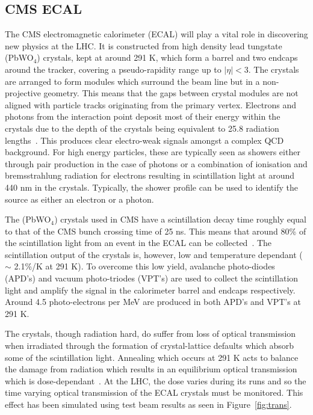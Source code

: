 \documentclass[a4paper,10pt]{article}
\begin{document}
\subsection{CMS ECAL}

The CMS electromagnetic calorimeter (ECAL) will play a vital role in discovering new physics at the LHC. It is constructed from high density lead tungstate (PbWO$_{4}$) crystals, kept at around 291 K, which
form a 
barrel and two endcaps around the tracker, covering a pseudo-rapidity range up to $|\eta | < 3$. The crystals are arranged to form modules which surround the beam line but in a non-projective geometry.
This means that the gaps between crystal modules are not aligned with particle tracks originating from the primary vertex.
Electrons and photons from the interaction point deposit most of their energy within the crystals due to the depth of the crystals being equivalent to 25.8 radiation lengths~\cite{TDR1}. This produces
clear electro-weak signals amongst a complex QCD background. For high energy particles, these are typically 
seen as showers either through pair production in the case of photons or a combination of ionisation and bremsstrahlung radiation for electrons resulting in scintillation light at around 440 nm in the
crystals. Typically, the shower profile can be used to identify the source as either an electron or a photon.

The (PbWO$_{4}$) crystals used in CMS have a scintillation decay time roughly equal to that of the CMS bunch crossing time of 25 ns. This means that around 80\% of the scintillation light from an event
in the ECAL can be collected~\cite{cmsdetector}. The scintillation output of the crystals is, however, low and temperature dependant ($\sim$ 2.1\%/K at 291 K). To overcome this low yield, 
avalanche photo-diodes (APD's) and vacuum photo-triodes (VPT's) are used to collect the scintillation light and amplify the signal in the calorimeter barrel and endcaps respectively. Around 4.5 photo-electrons
per MeV are produced in both APD's and VPT's at 291 K.

The crystals, though radiation hard, do suffer from loss of optical transmission when irradiated through the formation of crystal-lattice defaults which absorb some of the scintillation light. Annealing
which occurs at 291 K acts to balance the damage from radiation which results in an equilibrium optical transmission which is dose-dependant~\cite{cmsdetector}. At the LHC, the dose varies during its runs
and so the time varying optical transmission of the ECAL crystals must be monitored. This effect has been simulated using test beam results as seen in Figure~\ref{fig:trans}.
\end{document}
